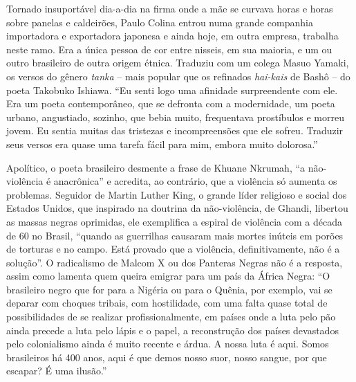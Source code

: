 \documentclass[
  letterpaper,
  DIV=11,
  numbers=noendperiod]{scrreprt}
\begin{document}
Tornado insuportável dia-a-dia na firma onde a mãe se curvava horas e
horas sobre panelas e caldeirões, Paulo Colina entrou numa grande
companhia importadora e exportadora japonesa e ainda hoje, em outra
empresa, trabalha neste ramo. Era a única pessoa de cor entre nisseis,
em sua maioria, e um ou outro brasileiro de outra origem étnica.
Traduziu com um colega Masuo Yamaki, os versos do gênero \emph{tanka} --
mais popular que os refinados \emph{hai-kais} de Bashô -- do poeta
Takobuko Ishiawa. ``Eu senti logo uma afinidade surpreendente com ele.
Era um poeta contemporâneo, que se defronta com a modernidade, um poeta
urbano, angustiado, sozinho, que bebia muito, frequentava prostíbulos e
morreu jovem. Eu sentia muitas das tristezas e incompreensões que ele
sofreu. Traduzir seus versos era quase uma tarefa fácil para mim, embora
muito dolorosa.''

Apolítico, o poeta brasileiro desmente a frase de Khuane Nkrumah, ``a
não-violência é anacrônica'' e acredita, ao contrário, que a violência
só aumenta os problemas. Seguidor de Martin Luther King, o grande líder
religioso e social dos Estados Unidos, que inspirado na doutrina da
não-violência, de Ghandi, libertou as massas negras oprimidas, ele
exemplifica a espiral de violência com a década de 60 no Brasil,
``quando as guerrilhas causaram mais mortes inúteis em porões de
torturas e no campo. Está provado que a violência, definitivamente, não
é a solução''. O radicalismo de Malcom X ou dos Panteras Negras não é a
resposta, assim como lamenta quem queira emigrar para um país da África
Negra: ``O brasileiro negro que for para a Nigéria ou para o Quênia, por
exemplo, vai se deparar com choques tribais, com hostilidade, com uma
falta quase total de possibilidades de se realizar profissionalmente, em
países onde a luta pelo pão ainda precede a luta pelo lápis e o papel, a
reconstrução dos países devastados pelo colonialismo ainda é muito
recente e árdua. A nossa luta é aqui. Somos brasileiros há 400 anos,
aqui é que demos nosso suor, nosso sangue, por que escapar? É uma
ilusão.''
\end{document}
